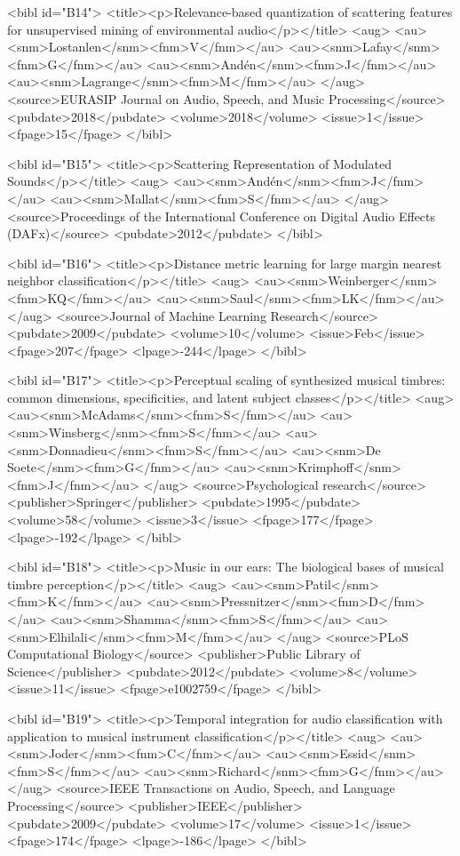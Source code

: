 \documentclass{bmcart}
\begin{document}
\begin{backmatter}
{<bibl id="B14">
  <title><p>Relevance-based quantization of scattering features for
  unsupervised mining of environmental audio</p></title>
  <aug>
    <au><snm>Lostanlen</snm><fnm>V</fnm></au>
    <au><snm>Lafay</snm><fnm>G</fnm></au>
    <au><snm>And{\'e}n</snm><fnm>J</fnm></au>
    <au><snm>Lagrange</snm><fnm>M</fnm></au>
  </aug>
  <source>EURASIP Journal on Audio, Speech, and Music Processing</source>
  <pubdate>2018</pubdate>
  <volume>2018</volume>
  <issue>1</issue>
  <fpage>15</fpage>
</bibl>

<bibl id="B15">
  <title><p>Scattering Representation of Modulated Sounds</p></title>
  <aug>
    <au><snm>And\'{e}n</snm><fnm>J</fnm></au>
    <au><snm>Mallat</snm><fnm>S</fnm></au>
  </aug>
  <source>Proceedings of the International Conference on Digital Audio Effects
  (DAFx)</source>
  <pubdate>2012</pubdate>
</bibl>

<bibl id="B16">
  <title><p>Distance metric learning for large margin nearest neighbor
  classification</p></title>
  <aug>
    <au><snm>Weinberger</snm><fnm>KQ</fnm></au>
    <au><snm>Saul</snm><fnm>LK</fnm></au>
  </aug>
  <source>Journal of Machine Learning Research</source>
  <pubdate>2009</pubdate>
  <volume>10</volume>
  <issue>Feb</issue>
  <fpage>207</fpage>
  <lpage>-244</lpage>
</bibl>

<bibl id="B17">
  <title><p>Perceptual scaling of synthesized musical timbres: common
  dimensions, specificities, and latent subject classes</p></title>
  <aug>
    <au><snm>McAdams</snm><fnm>S</fnm></au>
    <au><snm>Winsberg</snm><fnm>S</fnm></au>
    <au><snm>Donnadieu</snm><fnm>S</fnm></au>
    <au><snm>De Soete</snm><fnm>G</fnm></au>
    <au><snm>Krimphoff</snm><fnm>J</fnm></au>
  </aug>
  <source>Psychological research</source>
  <publisher>Springer</publisher>
  <pubdate>1995</pubdate>
  <volume>58</volume>
  <issue>3</issue>
  <fpage>177</fpage>
  <lpage>-192</lpage>
</bibl>

<bibl id="B18">
  <title><p>Music in our ears: {The} biological bases of musical timbre
  perception</p></title>
  <aug>
    <au><snm>Patil</snm><fnm>K</fnm></au>
    <au><snm>Pressnitzer</snm><fnm>D</fnm></au>
    <au><snm>Shamma</snm><fnm>S</fnm></au>
    <au><snm>Elhilali</snm><fnm>M</fnm></au>
  </aug>
  <source>PLoS Computational Biology</source>
  <publisher>Public Library of Science</publisher>
  <pubdate>2012</pubdate>
  <volume>8</volume>
  <issue>11</issue>
  <fpage>e1002759</fpage>
</bibl>

<bibl id="B19">
  <title><p>Temporal integration for audio classification with application to
  musical instrument classification</p></title>
  <aug>
    <au><snm>Joder</snm><fnm>C</fnm></au>
    <au><snm>Essid</snm><fnm>S</fnm></au>
    <au><snm>Richard</snm><fnm>G</fnm></au>
  </aug>
  <source>IEEE Transactions on Audio, Speech, and Language Processing</source>
  <publisher>IEEE</publisher>
  <pubdate>2009</pubdate>
  <volume>17</volume>
  <issue>1</issue>
  <fpage>174</fpage>
  <lpage>-186</lpage>
</bibl>

}
\end{backmatter}
\end{document}
